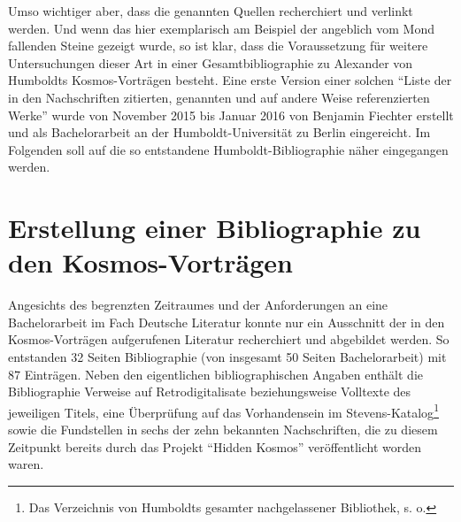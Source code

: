 Umso wichtiger aber, dass die genannten Quellen recherchiert und
verlinkt werden. Und wenn das hier exemplarisch am Beispiel der
angeblich vom Mond fallenden Steine gezeigt wurde, so ist klar, dass die
Voraussetzung für weitere Untersuchungen dieser Art in einer
Gesamtbibliographie zu Alexander von Humboldts Kosmos-Vorträgen besteht.
Eine erste Version einer solchen \enquote{Liste der in den Nachschriften
zitierten, genannten und auf andere Weise referenzierten Werke} wurde
von November 2015 bis Januar 2016 von Benjamin Fiechter erstellt und als
Bachelorarbeit an der Humboldt-Universität zu Berlin eingereicht. Im
Folgenden soll auf die so entstandene Humboldt-Bibliographie näher
eingegangen werden.

\section*{Erstellung einer Bibliographie zu den
Kosmos-Vorträgen}\label{erstellung-einer-bibliographie-zu-den-kosmos-vortruxe4gen}

Angesichts des begrenzten Zeitraumes und der Anforderungen an eine
Bachelorarbeit im Fach Deutsche Literatur konnte nur ein Ausschnitt der
in den Kosmos-Vorträgen aufgerufenen Literatur recherchiert und
abgebildet werden. So entstanden 32 Seiten Bibliographie (von insgesamt
50 Seiten Bachelorarbeit) mit 87 Einträgen. Neben den eigentlichen
bibliographischen Angaben enthält die Bibliographie Verweise auf
Retrodigitalisate beziehungsweise Volltexte des jeweiligen Titels, eine
Überprüfung auf das Vorhandensein im Stevens-Katalog\footnote{Das
  Verzeichnis von Humboldts gesamter nachgelassener Bibliothek, s. o.}
sowie die Fundstellen in sechs der zehn bekannten Nachschriften, die zu
diesem Zeitpunkt bereits durch das Projekt \enquote{Hidden Kosmos}
veröffentlicht worden waren.

